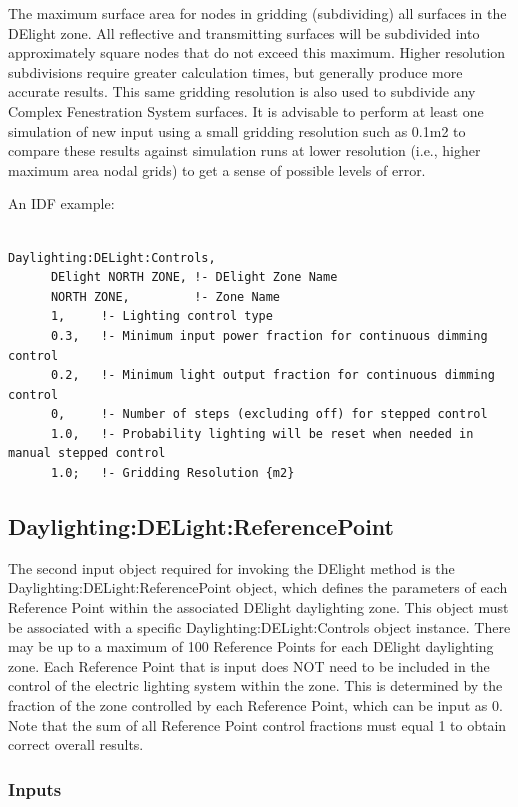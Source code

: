 The maximum surface area for nodes in gridding (subdividing) all surfaces in the DElight zone. All reflective and transmitting surfaces will be subdivided into approximately square nodes that do not exceed this maximum. Higher resolution subdivisions require greater calculation times, but generally produce more accurate results. This same gridding resolution is also used to subdivide any Complex Fenestration System surfaces. It is advisable to perform at least one simulation of new input using a small gridding resolution such as 0.1m2 to compare these results against simulation runs at lower resolution (i.e., higher maximum area nodal grids) to get a sense of possible levels of error.

An IDF example:

\begin{lstlisting}

Daylighting:DELight:Controls,
      DElight NORTH ZONE, !- DElight Zone Name
      NORTH ZONE,         !- Zone Name
      1,     !- Lighting control type
      0.3,   !- Minimum input power fraction for continuous dimming control
      0.2,   !- Minimum light output fraction for continuous dimming control
      0,     !- Number of steps (excluding off) for stepped control
      1.0,   !- Probability lighting will be reset when needed in manual stepped control
      1.0;   !- Gridding Resolution {m2}
\end{lstlisting}

\subsection{Daylighting:DELight:ReferencePoint}\label{daylightingdelightreferencepoint}

The second input object required for invoking the DElight method is the Daylighting:DELight:ReferencePoint object, which defines the parameters of each Reference Point within the associated DElight daylighting zone. This object must be associated with a specific Daylighting:DELight:Controls object instance. There may be up to a maximum of 100 Reference Points for each DElight daylighting zone. Each Reference Point that is input does NOT need to be included in the control of the electric lighting system within the zone. This is determined by the fraction of the zone controlled by each Reference Point, which can be input as 0. Note that the sum of all Reference Point control fractions must equal 1 to obtain correct overall results.

\subsubsection{Inputs}\label{inputs-2-008}


